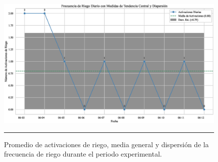 \documentclass[pdflatex,sn-mathphys-num]{sn-jnl}%
\theoremstyle{thmstyleone}%
\theoremstyle{thmstyletwo}%
\theoremstyle{thmstylethree}%
\begin{document}
\begin{figure}[H]
    \centering
    \includegraphics[width=1\textwidth]{assets/activaciones_riego_promedio_y_estadisticas.eps}
    \caption{Promedio de activaciones de riego, media general y dispersión de la frecuencia de riego durante el periodo experimental.}
    \label{fig:activaciones_riego_dispersion}

    \vspace{0.4cm}

    \noindent
    \begin{minipage}[t]{0.45\textwidth}
        \justifying
	\end{minipage}%
    \hfill
    \begin{minipage}[t]{0.45\textwidth}
        \justifying

\end{minipage}

    \vspace{0.5cm}
    \hrule
\end{figure}
\begin{multicols}{2}
\justifying
\end{multicols}
\end{document}
